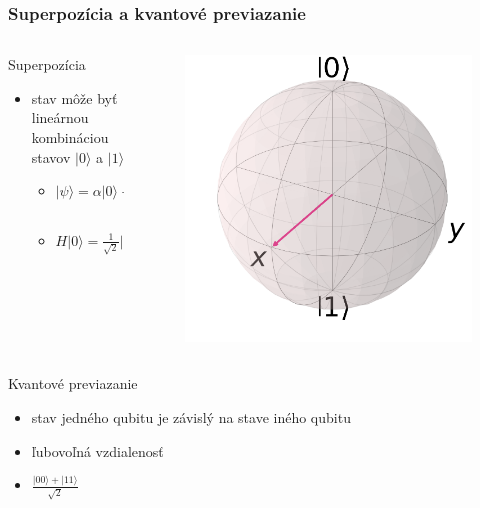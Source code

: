 \documentclass{beamer}
\newcommand{\ket}[1]{\lvert#1\rangle} %
\begin{document}
\begin{frame}[t]
	\frametitle{Superpozícia a kvantové previazanie}
	\begin{columns}[t]
		\begin{column}{.7\textwidth}
			Superpozícia

		\begin{itemize}
			\item stav môže byť lineárnou kombináciou stavov $\ket{0}$ a $\ket{1}$ 
			\begin{itemize}
			\item $\ket{\psi} = \alpha\ket{0} + \beta\ket{1}$
			\item $H\ket{0} = \frac{1}{\sqrt{2}}\ket{0} + \frac{1}{\sqrt{2}}\ket{1} = \begin{pmatrix}
				\frac{1}{\sqrt{2}}\\
				\frac{1}{\sqrt{2}}
				\end{pmatrix}$
		\end{itemize}
				
		\end{itemize}
	\end{column}
		\begin{column}{.3\textwidth}
			\centering
			
			\begin{figure}
				\centering
				\includegraphics[width=1\textwidth]{qubith.png}            
			\end{figure}
		\end{column}
	\end{columns}
	
	Kvantové previazanie
	\begin{itemize}
		\item stav jedného qubitu je závislý na stave iného qubitu
		\item ľubovoľná vzdialenosť 
		\item $\frac{\ket{00} + \ket{11}}{\sqrt{2}}$		
	\end{itemize}
\end{frame}
\end{document}
